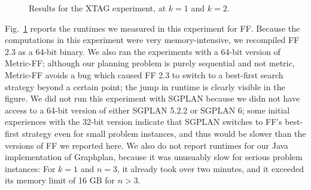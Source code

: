 \begin{figure}[t]
  \caption{Results for the XTAG experiment, at $k=1$ and $k=2$.}
  \label{fig:xtag-graph}
\end{figure}

Fig.~\ref{fig:xtag-graph} reports the runtimes we measured in this
experiment for FF. Because the computations in this experiment were
very memory-intensive, we recompiled FF 2.3 as a 64-bit binary. We
also ran the experiments with a 64-bit version of Metric-FF; although
our planning problem is purely sequential and not metric, Metric-FF
avoids a bug which caused FF 2.3 to switch to a best-first search
strategy beyond a certain point; the jump in runtime is clearly
visible in the figure. We did not run this experiment with SGPLAN
because we didn not have access to a 64-bit version of either SGPLAN
5.2.2 or SGPLAN 6; some initial experiences with the 32-bit version
indicate that SGPLAN switches to FF's best-first strategy even for
small problem instances, and thus would be slower than the versions of
FF we reported here. We also do not report runtimes for our Java
implementation of Graphplan, because it was unusuably slow for serious
problem instances: For $k=1$ and $n=3$, it already took over two
minutes, and it exceeded its memory limit of 16 GB for
$n>3$. 

